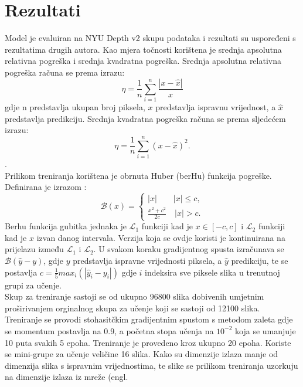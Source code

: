 \documentclass[times, utf8, zavrsni, numeric]{fer}
\begin{document}
\chapter{Rezultati}
Model je evaluiran na NYU Depth v2 skupu podataka i rezultati su uspoređeni s
rezultatima drugih autora. Kao mjera točnosti korištena je srednja apsolutna
relativna pogreška i srednja kvadratna pogreška. Srednja apsolutna relativna
pogreška računa se prema izrazu:
\begin{equation}
	\eta = \frac{1}{n}\sum_{i=1}^n\frac{|x - \hat{x}|}{x}
\end{equation}
gdje n predstavlja ukupan broj piksela, $x$ predstavlja ispravnu vrijednost, a
$\hat{x}$ predstavlja predikciju. Srednja kvadratna pogreška računa se prema
sljedećem izrazu:
\begin{equation}
	\eta = \frac{1}{n}\sum_{i=1}^n(x - \hat{x})^2.
\end{equation}.
\\\indent Prilikom treniranja korištena je obrnuta Huber (berHu) funkcija 
pogreške. Definirana je izrazom :
\begin{equation}
	\mathcal{B}(x) = 
	\begin{cases}
		|x| \quad \quad |x| \leq c, \\
		\frac{x^2+c^2}{2c} \quad |x| > c.
	\end{cases}
\end{equation}
Berhu funkcija gubitka jednaka je $\mathcal{L}_1$ funkciji kad je $x \in [-c, c]$
i $\mathcal{L}_2$ funkciji kad je $x$ izvan danog intervala. Verzija koja se
ovdje koristi je kontinuirana na prijelazu između $\mathcal{L}_1$ i 
$\mathcal{L}_2$. U svakom koraku gradijentnog spusta izračunava se
$\mathcal{B}(\hat{y} - y)$, gdje $y$ predstavlja ispravne vrijednosti 
piksela, a $\hat{y}$ predikciju, te se postavlja $c = \frac{1}{5}max_i(|\hat{y}
_i-y_i|)$ gdje $i$ indeksira sve piksele slika u trenutnoj grupi za učenje.
\\\indent Skup za treniranje sastoji se od ukupno 96800 slika dobivenih umjetnim
proširivanjem orginalnog skupa za učenje koji se sastoji od 12100 slika.
\\\indent Treniranje se provodi stohasitčkim gradijentnim spustom s metodom 
zaleta gdje se momentum postavlja na 0.9, a  
početna stopa učenja na $10^{-2}$  koja se umanjuje
10 puta svakih 5 epoha. Treniranje je provedeno kroz ukupno 20 epoha. Koriste se 
mini-grupe za učenje veličine 16 slika. Kako su
dimenzije izlaza manje od dimenzija slika s ispravnim vrijednostima, te slike
se prilikom treniranja uzorkuju na dimenzije izlaza iz mreže (engl. 
\end{document}
